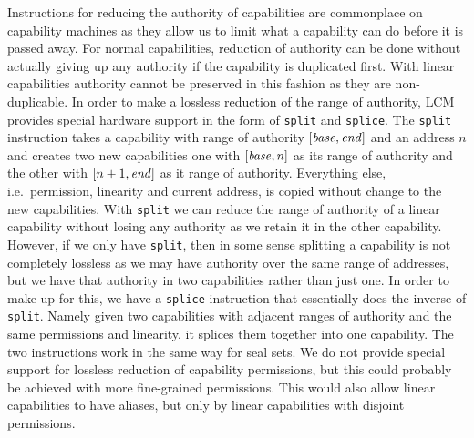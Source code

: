 \documentclass[acmsmall,review,anonymous]{acmart}\settopmatter{printfolios=true,printccs=false,printacmref=false}
\newcommand{\trgcm}{\textsc{LCM}}
\begin{document}
Instructions for reducing the authority of capabilities are commonplace on capability machines as they allow us to limit what a capability can do before it is passed away.
For normal capabilities, reduction of authority can be done without actually giving up any authority if the capability is duplicated first.
With linear capabilities authority cannot be preserved in this fashion as they are non-duplicable.
In order to make a lossless reduction of the range of authority, \trgcm{} provides special hardware support in the form of \texttt{split} and \texttt{splice}.
The \texttt{split} instruction takes a capability with range of authority $[\mathit{base},\mathit{end}]$ and an address $n$ and creates two new capabilities one with $[\mathit{base},n]$ as its range of authority and the other with $[n+1,\mathit{end}]$ as it range of authority.
Everything else, i.e.\ permission, linearity and current address, is copied without change to the new capabilities.
With \texttt{split} we can reduce the range of authority of a linear capability without losing any authority as we retain it in the other capability.
However, if we only have \texttt{split}, then in some sense splitting a capability is not completely lossless as we may have authority over the same range of addresses, but we have that authority in two capabilities rather than just one.
In order to make up for this, we have a \texttt{splice} instruction that essentially does the inverse of \texttt{split}.
Namely given two capabilities with adjacent ranges of authority and the same permissions and linearity, it splices them together into one capability.
The two instructions work in the same way for seal sets.
We do not provide special support for lossless reduction of capability permissions, but this could probably be achieved with more fine-grained permissions.
This would also allow linear capabilities to have aliases, but only by linear capabilities with disjoint permissions.
\end{document}
